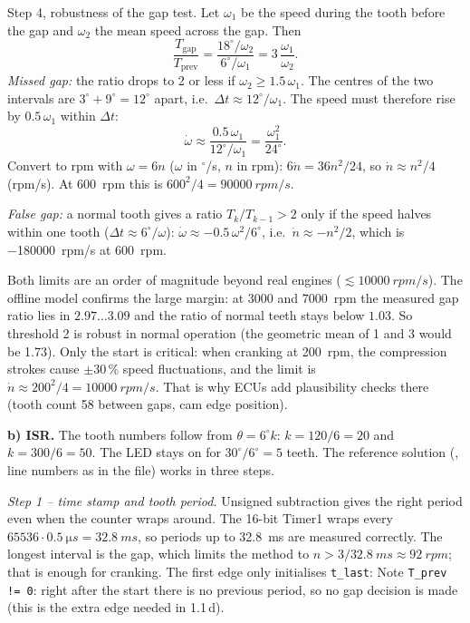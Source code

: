 \begin{solution}
Step 4, robustness of the gap test. Let $\omega_1$ be the speed during the
tooth before the gap and $\omega_2$ the mean speed across the gap. Then
\[ \frac{T_{\text{gap}}}{T_{\text{prev}}}=\frac{18^\circ/\omega_2}{6^\circ/\omega_1}
   =3\,\frac{\omega_1}{\omega_2}. \]
\emph{Missed gap:} the ratio drops to 2 or less if $\omega_2\ge1.5\,\omega_1$.
The centres of the two intervals are $3^\circ+9^\circ=12^\circ$ apart, i.e.\
$\Delta t\approx12^\circ/\omega_1$. The speed must therefore rise by
$0.5\,\omega_1$ within $\Delta t$:
\[ \dot\omega\approx\frac{0.5\,\omega_1}{12^\circ/\omega_1}=\frac{\omega_1^2}{24^\circ}. \]
Convert to rpm with $\omega=6n$ ($\omega$ in $^\circ$/s, $n$ in rpm):
$6\dot n=36n^2/24$, so $\dot n\approx n^2/4$ (rpm/s). At \SI{600}{rpm} this is
$600^2/4=\SI{90000}{rpm/s}$.

\emph{False gap:} a normal tooth gives a ratio $T_k/T_{k-1}>2$ only if the
speed halves within one tooth ($\Delta t\approx6^\circ/\omega$):
$\dot\omega\approx-0.5\,\omega^2/6^\circ$, i.e.\ $\dot n\approx-n^2/2$, which
is \SI{-180000}{rpm/s} at \SI{600}{rpm}.

Both limits are an order of magnitude beyond real engines
($\lesssim\SI{10000}{rpm/s}$). The offline model confirms the large margin:
at 3000 and \SI{7000}{rpm} the measured gap ratio lies in $2.97\dots3.09$ and
the ratio of normal teeth stays below $1.03$. So threshold 2 is robust in
normal operation (the geometric mean of 1 and 3 would be 1.73). Only the start
is critical: when cranking at \SI{200}{rpm}, the compression strokes cause
$\pm30\,\%$ speed fluctuations, and the limit is
$\dot n\approx200^2/4=\SI{10000}{rpm/s}$. That is why ECUs add plausibility
checks there (tooth count 58 between gaps, cam edge position).

\textbf{b) ISR.} The tooth numbers follow from $\theta=6^\circ k$:
$k=120/6=20$ and $k=300/6=50$. The LED stays on for $30^\circ/6^\circ=5$ teeth.
The reference solution
(, line numbers as in the
file) works in three steps.

\emph{Step 1 -- time stamp and tooth period.} Unsigned subtraction gives the
right period even when the counter wraps around. The 16-bit Timer1 wraps every
$65536\cdot\SI{0.5}{\micro s}=\SI{32.8}{ms}$, so periods up to \SI{32.8}{ms}
are measured correctly. The longest interval is the gap, which limits the
method to $n>3/\SI{32.8}{ms}\approx\SI{92}{rpm}$; that is enough for cranking.
The first edge only initialises \texttt{t\_last}:
Note \texttt{T\_prev != 0}: right after the start there is no previous period,
so no gap decision is made (this is the extra edge needed in 1.1\,d).


\end{solution}

